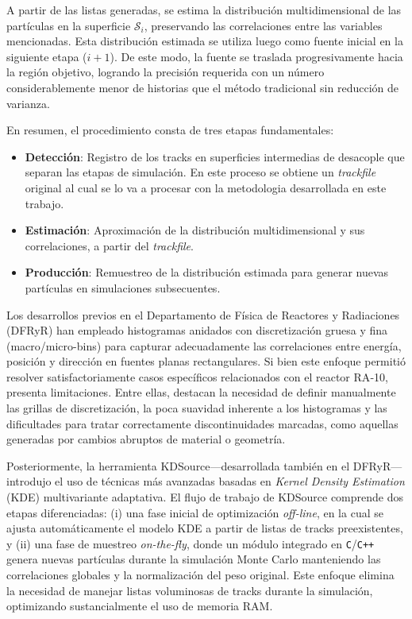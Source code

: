 A partir de las listas generadas, se estima la distribución multidimensional de las partículas en la superficie $\mathcal{S}_{i}$, preservando las correlaciones entre las variables mencionadas. Esta distribución estimada se utiliza luego como fuente inicial en la siguiente etapa ($i+1$). De este modo, la fuente se traslada progresivamente hacia la región objetivo, logrando la precisión requerida con un número considerablemente menor de historias que el método tradicional sin reducción de varianza.

En resumen, el procedimiento consta de tres etapas fundamentales:

\begin{itemize}
    \item \textbf{Detección}: Registro de los tracks en superficies intermedias de desacople que separan las etapas de simulación. En este proceso se obtiene un \emph{trackfile} original al cual se lo va a procesar con la metodologia desarrollada en este trabajo.
    \item \textbf{Estimación}: Aproximación de la distribución multidimensional y sus correlaciones, a partir del \emph{trackfile}.
    \item \textbf{Producción}: Remuestreo de la distribución estimada para generar nuevas partículas en simulaciones subsecuentes.
\end{itemize}

Los desarrollos previos en el Departamento de Física de Reactores y Radiaciones (DFRyR) han empleado histogramas anidados con discretización gruesa y fina (macro/micro-bins) para capturar adecuadamente las correlaciones entre energía, posición y dirección en fuentes planas rectangulares. Si bien este enfoque permitió resolver satisfactoriamente casos específicos relacionados con el reactor RA‑10, presenta limitaciones. Entre ellas, destacan la necesidad de definir manualmente las grillas de discretización, la poca suavidad inherente a los histogramas y las dificultades para tratar correctamente discontinuidades marcadas, como aquellas generadas por cambios abruptos de material o geometría.

Posteriormente, la herramienta KDSource—desarrollada también en el DFRyR—introdujo el uso de técnicas más avanzadas basadas en \textit{Kernel Density Estimation} (KDE) multivariante adaptativa. El flujo de trabajo de KDSource comprende dos etapas diferenciadas: (i) una fase inicial de optimización \emph{off-line}, en la cual se ajusta automáticamente el modelo KDE a partir de listas de tracks preexistentes, y (ii) una fase de muestreo \emph{on-the-fly}, donde un módulo integrado en \texttt{C}/\texttt{C++} genera nuevas partículas durante la simulación Monte Carlo manteniendo las correlaciones globales y la normalización del peso original. Este enfoque elimina la necesidad de manejar listas voluminosas de tracks durante la simulación, optimizando sustancialmente el uso de memoria RAM.


